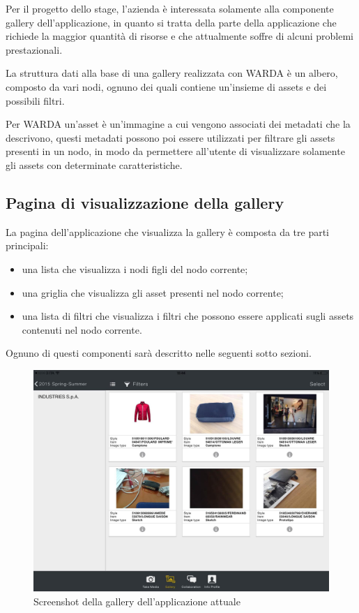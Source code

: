 Per il progetto dello stage, l'azienda è interessata solamente alla componente gallery dell'applicazione, in quanto si tratta della parte della applicazione che richiede la maggior quantità di risorse e che attualmente soffre di alcuni problemi prestazionali.

La struttura dati alla base di una gallery realizzata con WARDA è un albero, composto da vari nodi, ognuno dei quali contiene un'insieme di assets e dei possibili filtri.

Per WARDA un'asset è un'immagine a cui vengono associati dei metadati che la descrivono, questi metadati possono poi essere utilizzati per filtrare gli assets presenti in un nodo, in modo da permettere all'utente di visualizzare solamente gli assets con determinate caratteristiche.

\subsection{Pagina di visualizzazione della gallery}

La pagina dell'applicazione che visualizza la gallery è composta da tre parti principali:
\begin{itemize}
\item una lista che visualizza i nodi figli del nodo corrente;
\item una griglia che visualizza gli asset presenti nel nodo corrente;
\item una lista di filtri che visualizza i filtri che possono essere applicati sugli assets contenuti nel nodo corrente.
\end{itemize}
Ognuno di questi componenti sarà descritto nelle seguenti sotto sezioni.

\begin{figure}[htbp]
\centering
\includegraphics[width=\textwidth]{../immagini/warda-gallery}
\caption{Screenshot della gallery dell'applicazione attuale}  
\end{figure}

